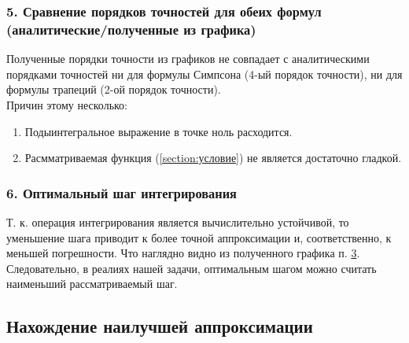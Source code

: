 \subsubsection{5. Сравнение порядков точностей для обеих формул (аналитические/полученные из графика)}
Полученные порядки точности из графиков не совпадает с аналитическими порядками точностей ни для формулы Симпсона (4-ый порядок точности), ни для формулы трапеций (2-ой порядок точности). \\
Причин этому несколько:
\begin{enumerate}
	\item  Подыинтегральное выражение в точке ноль расходится.
	\item Расмматриваемая функция (\ref{section:условие}) не является достаточно гладкой.
\end{enumerate}
\subsubsection{6. Оптимальный шаг интегрирования}
Т. к. операция интегрирования является вычислительно устойчивой, то уменьшение шага приводит к более точной аппроксимации и, соответственно, к меньшей погрешности. Что наглядно видно из полученного графика п. \hyperlink{f}{3}.
Следовательно, в реалиях нашей задачи, оптимальным шагом можно считать наименьший рассматриваемый шаг. 
\subsection{Нахождение наилучшей аппроксимации}
